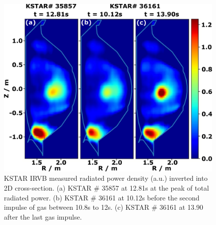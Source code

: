 \begin{figure}[!h]
 \centering
 \includegraphics[width=\linewidth]{figures/Prad_2D.pdf}
 \caption{
KSTAR IRVB measured radiated power density (a.u.) inverted into 2D cross-section.
(a) KSTAR \# 35857 at 12.81s at the peak of total radiated power.
(b) KSTAR \# 36161 at 10.12s before  the second impulse of gas between 10.8s to 12s.
(c) KSTAR \# 36161 at 13.90 after the last gas impulse.
}
\label{fig:prad_2d}
\end{figure}